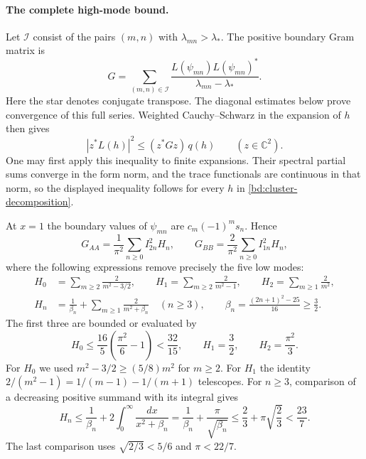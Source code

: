 \documentclass[11pt,reqno]{amsart}
\numberwithin{equation}{section}
\begin{document}
\paragraph{The complete high-mode bound.}
Let $\mathcal I$ consist of the pairs $(m,n)$ with
$\lambda_{mn}>\lambda_*$. The positive boundary Gram matrix is
\begin{equation}
 G=\sum_{(m,n)\in\mathcal I}
 \frac{L(\psi_{mn})L(\psi_{mn})^*}{\lambda_{mn}-\lambda_*}.
 \label{bd:gram-definition}
\end{equation}
Here the star denotes conjugate transpose. The diagonal estimates below
prove convergence of this full series. Weighted Cauchy--Schwarz in the
expansion of $h$ then gives
\begin{equation}
 |z^*L(h)|^2\le (z^*Gz)\,q(h)
 \qquad(z\in\mathbb C^2).
 \label{bd:gram-cauchy}
\end{equation}
One may first apply this inequality to finite expansions. Their spectral
partial sums converge in the form norm, and the trace functionals are
continuous in that norm, so the displayed inequality follows for every
$h$ in \eqref{bd:cluster-decomposition}.

At $x=1$ the boundary values of $\psi_{mn}$ are
$c_m(-1)^m s_n$. Hence
\begin{equation}
 G_{AA}=\frac1{\pi^2}\sum_{n\ge0}I_{2n}^2H_n,
 \qquad
 G_{BB}=\frac2{\pi^2}\sum_{n\ge0}I_{1n}^2H_n,
 \label{bd:gram-diagonals}
\end{equation}
where the following expressions remove precisely the five low modes:
\begin{equation}
 \begin{aligned}
  H_0&=\sum_{m\ge2}\frac2{m^2-3/2},\qquad
  H_1=\sum_{m\ge2}\frac2{m^2-1},\qquad
  H_2=\sum_{m\ge1}\frac2{m^2},\\
  H_n&=\frac1{\beta_n}+\sum_{m\ge1}\frac2{m^2+\beta_n}
        \quad(n\ge3),\qquad
  \beta_n=\frac{(2n+1)^2-25}{16}\ge\frac32.
 \end{aligned}
 \label{bd:high-sums}
\end{equation}
The first three are bounded or evaluated by
\begin{equation}
 H_0\le\frac{16}{5}\left(\frac{\pi^2}{6}-1\right)
       <\frac{32}{15},\qquad
 H_1=\frac32,\qquad H_2=\frac{\pi^2}{3}.
 \label{bd:first-high-sums}
\end{equation}
For $H_0$ we used $m^2-3/2\ge(5/8)m^2$ for $m\ge2$.
For $H_1$ the identity
$2/(m^2-1)=1/(m-1)-1/(m+1)$ telescopes. For $n\ge3$, comparison of a
decreasing positive summand with its integral gives
\begin{equation}
 H_n\le\frac1{\beta_n}
       +2\int_0^\infty\frac{dx}{x^2+\beta_n}
 =\frac1{\beta_n}+\frac\pi{\sqrt{\beta_n}}
 \le\frac23+\pi\sqrt{\frac23}<\frac{23}{7}.
 \label{bd:infinite-high-sums}
\end{equation}
The last comparison uses $\sqrt{2/3}<5/6$ and $\pi<22/7$.
\end{document}
